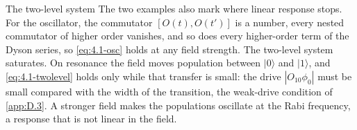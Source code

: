 \begin{workedexample}{The two-level system}
The two examples also mark where linear response stops. For the oscillator, the commutator $[O(t), O(t')]$ is a number, every nested commutator of higher order vanishes, and so does every higher-order term of the Dyson series, so \cref{eq:4.1-osc} holds at any field strength. The two-level system saturates. On resonance the field moves population between $|0\rangle$ and $|1\rangle$, and \cref{eq:4.1-twolevel} holds only while that transfer is small: the drive $|O_{10}\phi_0|$ must be small compared with the width of the transition, the weak-drive condition of \cref{app:D.3}. A stronger field makes the populations oscillate at the Rabi frequency, a response that is not linear in the field.
\end{workedexample}
